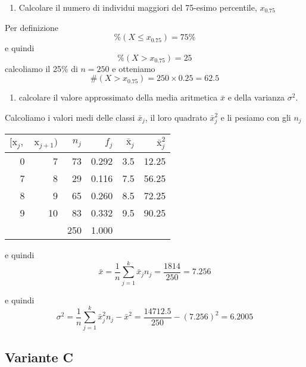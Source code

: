 \documentclass[
  11pt,
]{book}
\providecommand{\tightlist}{%
  \setlength{\itemsep}{0pt}\setlength{\parskip}{0pt}}
\theoremstyle{mytheoremstyle}
\theoremstyle{mydefstyle}
\newenvironment{sol}
  {
  \begin{tcolorbox}[enhanced,breakable,arc=0.1mm,boxrule=1pt,colback=white,colframe=iblue,
  title=\bf \fontfamily{lmss}\selectfont \hspace{.5 cm} Soluzione,drop fuzzy shadow]

}{
\end{tcolorbox}
  }
\begin{document}
\begin{enumerate}
\def\labelenumi{\alph{enumi}.}
\setcounter{enumi}{2}
\tightlist
\item
  Calcolare il numero di individui maggiori del 75-esimo percentile, \(x_{0.75}\)
\end{enumerate}

\begin{sol}
Per definizione
\[
\%(X\le x_{0.75})=75\%
\]
e quindi
\[
\%(X> x_{0.75}) = 25%
\]
calcoliamo il 25\% di \(n=250\) e otteniamo
\[
\#(X>x_{0.75})=250\times 0.25=62.5
\]

\end{sol}

\begin{enumerate}
\def\labelenumi{\alph{enumi}.}
\setcounter{enumi}{3}
\tightlist
\item
  calcolare il valore approssimato della media aritmetica \(\bar x\) e della varianza \(\sigma^2\).
\end{enumerate}

\begin{sol}

Calcoliamo i valori medi delle classi \(\bar x_j\), il loro quadrato \(\bar x_j^2\) e li pesiamo con gli \(n_j\)

\begin{table}[H]
\centering
\begin{tabular}{rrrrrr}
\toprule
$[\text{x}_j,$ & $\text{x}_{j+1})$ & $n_j$ & $f_j$ & $\bar{\text{x}}_j$ & $\bar{\text{x}}_j^2$\\
\midrule
0 & 7 & 73 & 0.292 & 3.5 & 12.25\\
7 & 8 & 29 & 0.116 & 7.5 & 56.25\\
8 & 9 & 65 & 0.260 & 8.5 & 72.25\\
9 & 10 & 83 & 0.332 & 9.5 & 90.25\\
 &  & 250 & 1.000 &  & \\
\bottomrule
\end{tabular}
\end{table}

e quindi
\[
\bar x= \frac 1n\sum_{j=1}^k\bar x_jn_j=\frac{1814}{250}=7.256
\]

e quindi
\[
\sigma^2= \frac 1n\sum_{j=1}^k\bar x_j^2n_j-\bar x^2=\frac{14712.5}{250}-(7.256)^2=6.2005
\]

\end{sol}

\subsection{Variante C}\label{variante-c}
\end{document}
